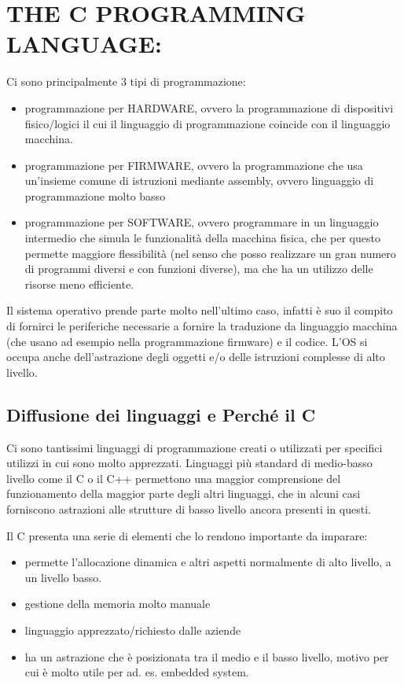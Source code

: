 \documentclass[
]{article}
\begin{document}
\hypertarget{header-n316}{%
\section{THE C PROGRAMMING LANGUAGE:}\label{header-n316}}

Ci sono principalmente 3 tipi di programmazione:

\begin{itemize}
\item
  programmazione per HARDWARE, ovvero la programmazione di dispositivi
  fisico/logici il cui il linguaggio di programmazione coincide con il
  linguaggio macchina.
\item
  programmazione per FIRMWARE, ovvero la programmazione che usa
  un'insieme comune di istruzioni mediante assembly, ovvero linguaggio
  di programmazione molto basso
\item
  programmazione per SOFTWARE, ovvero programmare in un linguaggio
  intermedio che simula le funzionalità della macchina fisica, che per
  questo permette maggiore flessibilità (nel senso che posso realizzare
  un gran numero di programmi diversi e con funzioni diverse), ma che ha
  un utilizzo delle risorse meno efficiente.
\end{itemize}

Il sistema operativo prende parte molto nell'ultimo caso, infatti è suo
il compito di fornirci le periferiche necessarie a fornire la traduzione
da linguaggio macchina (che usano ad esempio nella programmazione
firmware) e il codice. L'OS si occupa anche dell'astrazione degli
oggetti e/o delle istruzioni complesse di alto livello.

\hypertarget{header-n326}{%
\subsection{Diffusione dei linguaggi e Perché il C}\label{header-n326}}

Ci sono tantissimi linguaggi di programmazione creati o utilizzati per
specifici utilizzi in cui sono molto apprezzati. Linguaggi più standard
di medio-basso livello come il C o il C++ permettono una maggior
comprensione del funzionamento della maggior parte degli altri
linguaggi, che in alcuni casi forniscono astrazioni alle strutture di
basso livello ancora presenti in questi.

Il C presenta una serie di elementi che lo rendono importante da
imparare:

\begin{itemize}
\item
  permette l'allocazione dinamica e altri aspetti normalmente di alto
  livello, a un livello basso.
\item
  gestione della memoria molto manuale
\item
  linguaggio apprezzato/richiesto dalle aziende
\item
  ha un astrazione che è posizionata tra il medio e il basso livello,
  motivo per cui è molto utile per ad. es. embedded system.
\end{itemize}
\end{document}
